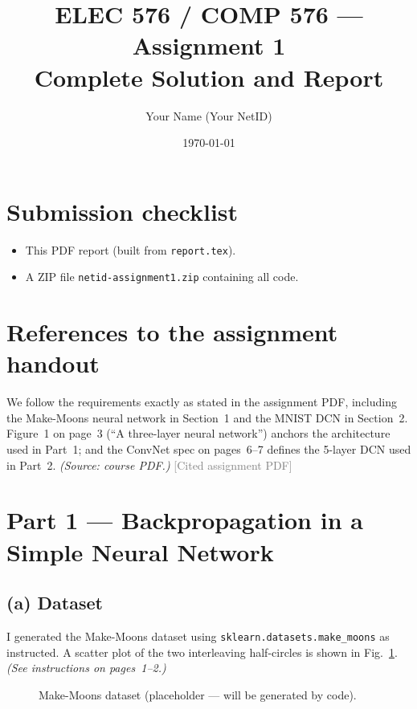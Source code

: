 \documentclass[11pt]{article}
\title{ELEC 576 / COMP 576 --- Assignment 1\\\large Complete Solution and Report}
\author{Your Name (Your NetID)}
\date{\today}
\begin{document}
\maketitle

\section*{Submission checklist}
\begin{itemize}[leftmargin=1.2em]
  \item This PDF report (built from \texttt{report.tex}).
  \item A ZIP file \texttt{netid-assignment1.zip} containing all code.
\end{itemize}

\section{References to the assignment handout}
We follow the requirements exactly as stated in the assignment PDF, including the Make-Moons neural network in Section~1 and the MNIST DCN in Section~2. Figure~1 on page~3 (``A three-layer neural network'') anchors the architecture used in Part~1; and the ConvNet spec on pages~6--7 defines the 5-layer DCN used in Part~2. \textit{(Source: course PDF.)} \textcolor{gray}{[Cited assignment PDF]}

\section{Part 1 --- Backpropagation in a Simple Neural Network}
\subsection{(a) Dataset}
I generated the Make-Moons dataset using \texttt{sklearn.datasets.make\_moons} as instructed. A scatter plot of the two interleaving half-circles is shown in Fig.~\ref{fig:moons-scatter}. \textit{(See instructions on pages~1--2.)}

\begin{figure}[h]
  \centering
  \caption{Make-Moons dataset (placeholder --- will be generated by code).}
  \label{fig:moons-scatter}
\end{figure}
\end{document}
